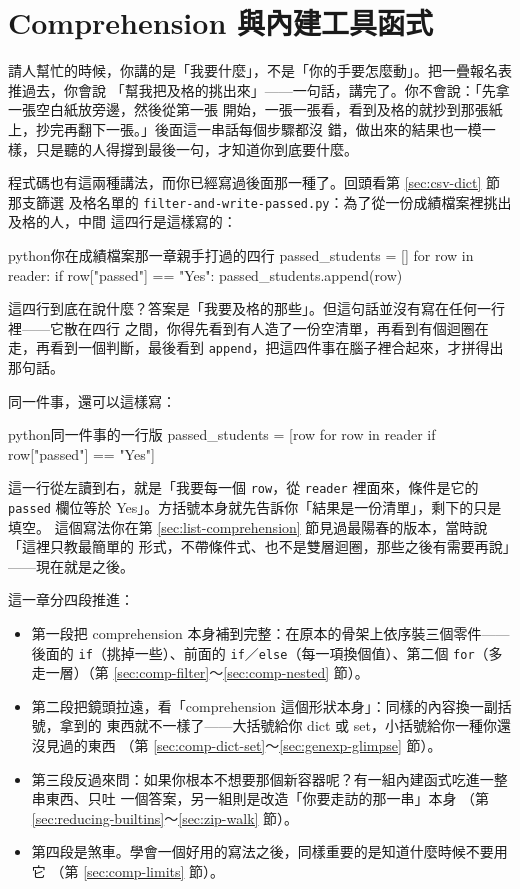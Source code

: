 \chapter{Comprehension 與內建工具函式}
\label{ch:comprehensions}

請人幫忙的時候，你講的是「我要什麼」，不是「你的手要怎麼動」。把一疊報名表推過去，你會說
「幫我把及格的挑出來」——一句話，講完了。你不會說：「先拿一張空白紙放旁邊，然後從第一張
開始，一張一張看，看到及格的就抄到那張紙上，抄完再翻下一張。」後面這一串話每個步驟都沒
錯，做出來的結果也一模一樣，只是聽的人得撐到最後一句，才知道你到底要什麼。

程式碼也有這兩種講法，而你已經寫過後面那一種了。回頭看第 \ref{sec:csv-dict} 節那支篩選
及格名單的 \texttt{filter-and-write-passed.py}：為了從一份成績檔案裡挑出及格的人，中間
這四行是這樣寫的：

\begin{code}{python}{你在成績檔案那一章親手打過的四行}
passed_students = []
for row in reader:
    if row["passed"] == "Yes":
        passed_students.append(row)
\end{code}

這四行到底在說什麼？答案是「我要及格的那些」。但這句話並沒有寫在任何一行裡——它散在四行
之間，你得先看到有人造了一份空清單，再看到有個迴圈在走，再看到一個判斷，最後看到
\texttt{append}，把這四件事在腦子裡合起來，才拼得出那句話。

同一件事，還可以這樣寫：

\begin{code}{python}{同一件事的一行版}
passed_students = [row for row in reader if row["passed"] == "Yes"]
\end{code}

這一行從左讀到右，就是「我要每一個 \texttt{row}，從 \texttt{reader} 裡面來，條件是它的
\texttt{passed} 欄位等於 Yes」。方括號本身就先告訴你「結果是一份清單」，剩下的只是填空。
這個寫法你在第 \ref{sec:list-comprehension} 節見過最陽春的版本，當時說「這裡只教最簡單的
形式，不帶條件式、也不是雙層迴圈，那些之後有需要再說」——現在就是之後。

這一章分四段推進：

\begin{itemize}
\item 第一段把 comprehension 本身補到完整：在原本的骨架上依序裝三個零件——後面的
\texttt{if}（挑掉一些）、前面的 \texttt{if}／\texttt{else}（每一項換個值）、第二個
\texttt{for}（多走一層）（第 \ref{sec:comp-filter}～\ref{sec:comp-nested} 節）。
\item 第二段把鏡頭拉遠，看「comprehension 這個形狀本身」：同樣的內容換一副括號，拿到的
東西就不一樣了——大括號給你 dict 或 set，小括號給你一種你還沒見過的東西
（第 \ref{sec:comp-dict-set}～\ref{sec:genexp-glimpse} 節）。
\item 第三段反過來問：如果你根本不想要那個新容器呢？有一組內建函式吃進一整串東西、只吐
一個答案，另一組則是改造「你要走訪的那一串」本身
（第 \ref{sec:reducing-builtins}～\ref{sec:zip-walk} 節）。
\item 第四段是煞車。學會一個好用的寫法之後，同樣重要的是知道什麼時候不要用它
（第 \ref{sec:comp-limits} 節）。
\end{itemize}

